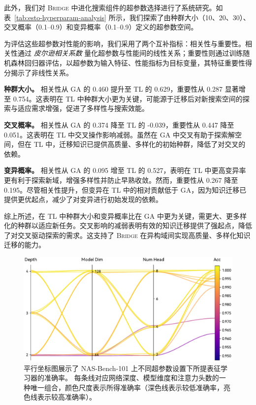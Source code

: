 \documentclass[../main.tex]{subfiles}
\begin{document}
此外，我们对 \textsc{Bridge} 中进化搜索组件的超参数选择进行了系统研究。如表~\ref{tab:esto-hyperparam-analysis} 所示，我们探索了由种群大小（10、20、30）、交叉概率（0.1–0.9）和变异概率（0.1–0.9）定义的超参数空间。

为评估这些超参数对性能的影响，我们采用了两个互补指标：相关性与重要性。相关性通过 \textit{皮尔逊相关系数} 量化超参数与性能间的线性关系；重要性则通过训练随机森林回归器评估，以超参数为输入特征、性能指标为目标变量，其特征重要性得分揭示了非线性关系。

\textbf{种群大小。}
相关性从 GA 的 0.460 提升至 TL 的 0.629，重要性从 0.287 显著增至 0.754。这表明在 TL 中种群大小更为关键，可能源于迁移后对新搜索空间的探索与适应需求增强，促进了多样性与搜索效能。

\textbf{交叉概率。}
相关性从 GA 的 0.374 降至 TL 的 -0.039，重要性从 0.447 降至 0.051。这表明在 TL 中交叉操作影响减弱。虽然在 GA 中交叉有助于探索解空间，但在 TL 中，迁移知识已提供高质量、多样化的初始种群，降低了对交叉的依赖。

\textbf{变异概率。}
相关性从 GA 的 0.095 增至 TL 的 0.527，表明在 TL 中更高变异率更有利于探索新域，增强多样性并防止早熟收敛。然而，重要性从 0.267 降至 0.195。尽管相关性提升，但变异在 TL 中的相对贡献低于 GA，因为知识迁移已提供更优起点，减少了对变异进行初始发现的依赖。

综上所述，在 TL 中种群大小和变异概率比在 GA 中更为关键，需更大、更多样化的种群以适应新任务。交叉影响的减弱表明有效的知识迁移提供了强起点，降低了对交叉驱动探索的需求。这支持了 \textsc{Bridge} 在异构域间实现高质量、多样化知识迁移的能力。

\begin{figure}
	\centering
	\includegraphics[width=.8\linewidth]{BRIDGE/hpsa.pdf}
	\caption{
		平行坐标图展示了 NAS-Bench-101 上不同超参数设置下所提表征学习器的准确率。
		每条线对应网络深度、模型维度和注意力头数的一种唯一组合，颜色尺度表示所得准确率（深色线表示较低准确率，亮色线表示较高准确率）。
	}\label{fig:hyperparam-sensitivity}
\end{figure}
\end{document}
